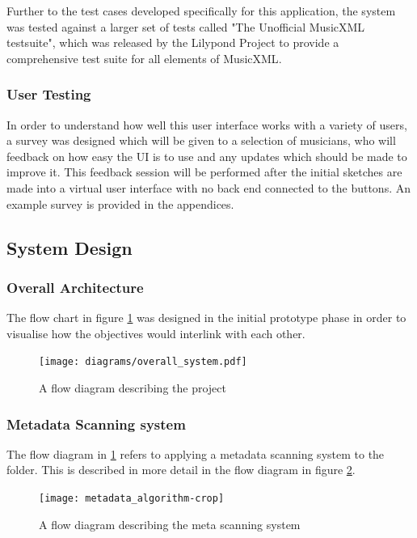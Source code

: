 Further to the test cases developed specifically for this application, the system was tested against a larger set of tests called "The Unofficial MusicXML testsuite", which was released by the Lilypond Project to provide a comprehensive test suite for all elements of MusicXML\parencite{LilypondTestcase}. 

\subsubsection{User Testing}
In order to understand how well this user interface works with a variety of users, a survey was designed which will be given to a selection of musicians, who will feedback on how easy the UI is to use and any updates which should be made to improve it. This feedback session will be performed after the initial sketches are made into a virtual user interface with no back end connected to the buttons. An example survey is provided in the appendices.

\subsection{System Design}
\subsubsection{Overall Architecture}
The flow chart in figure \ref{fig:flowchart} was designed in the initial prototype phase in order to visualise how the objectives would interlink with each other.
\begin{figure}[H]
    \centering
    \texttt{[image: diagrams/overall\_system.pdf]}
    \caption{A flow diagram describing the project}
    \label{fig:flowchart}
\end{figure}

\subsubsection{Metadata Scanning system}
The flow diagram in \ref{fig:flowchart} refers to applying a metadata scanning system to the folder. This is described in more detail in the flow diagram in figure \ref{fig:meta}. 
\begin{figure}[H]
    \centering
    \texttt{[image: metadata\_algorithm-crop]}
    \caption{A flow diagram describing the meta scanning system}
    \label{fig:meta}
\end{figure}
